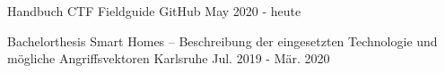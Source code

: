 


\begin{cventries}

  \cventry
    {Handbuch} %
    {CTF Fieldguide} %
    {GitHub} %
    {May 2020 - heute} %
    {
      \begin{cvitems} %
        \item {\lipsum[8][1-4]}
        \item {\lipsum[9][1-2]}
      \end{cvitems}
    }

  \cventry
    {Bachelorthesis} %
    {
    Smart Homes \textnormal{\fontsize{10pt}{1em}\bodyfontlight\upshape -- Beschreibung der eingesetzten Technologie und mögliche Angriffsvektoren}} %
    {Karlsruhe} %
    {Jul. 2019 - Mär. 2020} %
    {
      \begin{cvitems} %
        \item {\lipsum[10][1-4]}
        \item {\lipsum[11][1-2]}
      \end{cvitems}
    }

\end{cventries}

